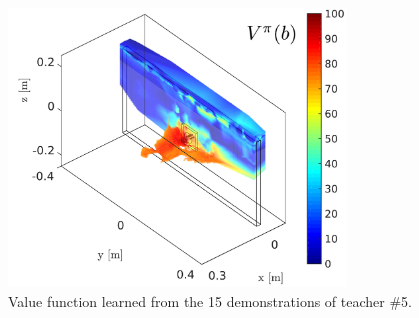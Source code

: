 \begin{figure}
 \centering
 \includegraphics[width=0.8\textwidth]{./ch4-PiH/Figures/Fig/value_subj_5.pdf}
 \caption{Value function learned from the 15 demonstrations of teacher \#5.}
 \label{fig:value_function_subj_5}
\end{figure}
 

